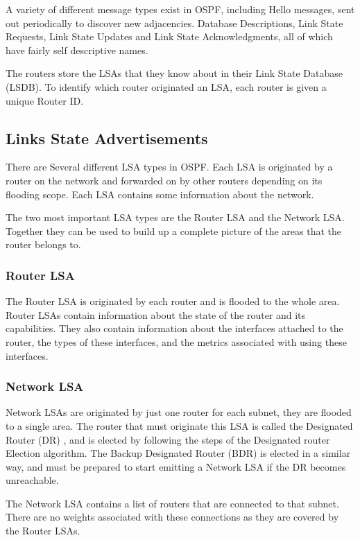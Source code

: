 \documentclass[12pt]{report}
\begin{document}
A variety of different message types exist in OSPF, including Hello messages,
sent out periodically to discover new adjacencies. Database Descriptions, Link
State Requests, Link State Updates and Link State Acknowledgments, all of which
have fairly self descriptive names.

The routers store the LSAs that they know about in their Link State Database
(LSDB).  To identify which router
originated an LSA, each router is given a unique Router ID.

\subsection{Links State Advertisements}
There are Several different LSA types in OSPF\@. Each LSA is originated by
a router on the network and forwarded on by other routers depending on its
flooding scope. Each LSA contains some information about the network. 
 
The two most important LSA types are the Router LSA and the Network LSA\@.
Together they can be used to build up a complete picture of the areas that the
router belongs to. 

\subsubsection{Router LSA}
The Router LSA is originated by each router and is flooded to the whole area.
Router LSAs contain information about the state of the router and its
capabilities. They also contain information about the interfaces attached to
the router, the types of these interfaces, and the metrics associated with
using these interfaces. 

\subsubsection{Network LSA}
Network LSAs are originated by just one router for each subnet, they are
flooded to a single area. The router that must originate this LSA is called the
Designated Router (DR) , and is elected
by following the steps of the Designated router Election algorithm. The Backup
Designated Router (BDR)  is
elected in a similar way, and must be prepared to start emitting a Network LSA
if the DR becomes unreachable. 

The Network LSA contains a list of routers that are connected to that subnet.
There are no weights associated with these connections as they are covered by
the Router LSAs. 
\end{document}
